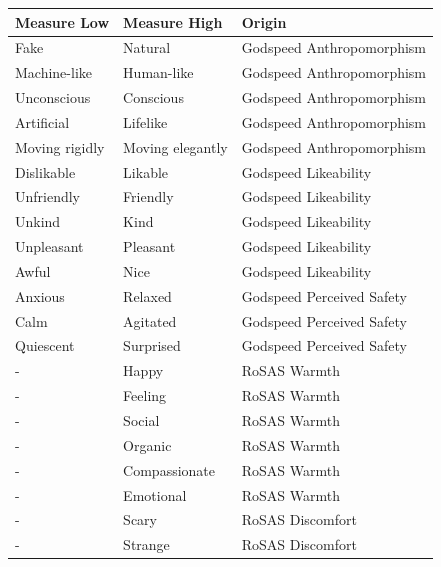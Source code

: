 \documentclass[nomenclature, english, biblatex]{kththesis}
\begin{document}
\begin{table}
    \centering
    \begin{adjustbox}{max width=\textwidth}
        \begin{tabular}{|p{}|p{}|p{}|}
        \hline
        Measure Low & Measure High & Origin \\
        \hline
        \hline
        Fake & Natural & Godspeed Anthropomorphism\\
        \hline
        Machine-like & Human-like & Godspeed Anthropomorphism\\
        \hline
        Unconscious & Conscious & Godspeed Anthropomorphism\\
        \hline
        Artificial & Lifelike & Godspeed Anthropomorphism\\
        \hline
        Moving rigidly& Moving elegantly & Godspeed Anthropomorphism\\
        \hline
        Dislikable & Likable & Godspeed Likeability\\
        \hline
        Unfriendly & Friendly & Godspeed Likeability\\
        \hline
        Unkind & Kind & Godspeed Likeability\\
        \hline
        Unpleasant & Pleasant & Godspeed Likeability\\
        \hline
        Awful & Nice & Godspeed Likeability\\
        \hline
        Anxious & Relaxed & Godspeed Perceived Safety\\
        \hline
        Calm & Agitated & Godspeed Perceived Safety\\
        \hline
        Quiescent & Surprised & Godspeed Perceived Safety\\
        \hline
        - & Happy & RoSAS Warmth \\
        \hline
        - & Feeling & RoSAS Warmth\\
        \hline
        - & Social & RoSAS Warmth\\
        \hline
        - & Organic & RoSAS Warmth\\
        \hline
        - & Compassionate & RoSAS Warmth\\
        \hline
        - & Emotional & RoSAS Warmth\\
        \hline
        - & Scary & RoSAS Discomfort\\
        \hline
        - & Strange & RoSAS Discomfort\\
        \hline

\end{tabular}
\end{adjustbox}
\end{table}
\end{document}
